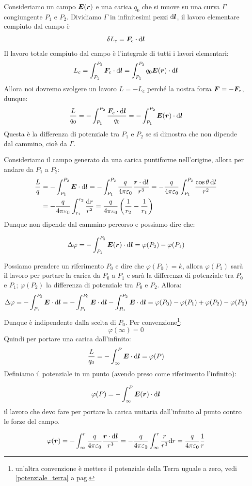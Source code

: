 Consideriamo un campo $\boldsymbol{E}(\boldsymbol{r})$ e una carica $q_0$ che si muove su una curva $\Gamma$ congiungente $P_1$ e $P_2$. Dividiamo $\Gamma$ in infinitesimi pezzi $\mathrm{d}\boldsymbol{l}$, il lavoro elementare compiuto dal campo è
\[\delta L_c=\boldsymbol{F}_c\cdot\mathrm{d}\boldsymbol{l}\]
Il lavoro totale compiuto dal campo è l'integrale di tutti i lavori elementari:
\[L_c=\int_{P_1}^{P_2}\boldsymbol{F}_c\cdot\mathrm{d}\boldsymbol{l}=\int_{P_1}^{P_2}q_0\boldsymbol{E}(\boldsymbol{r})\cdot \mathrm{d} \boldsymbol{l}\]
Allora noi dovremo svolgere un lavoro $L=-L_c$ perché la nostra forza $\boldsymbol{F}=-\boldsymbol{F}_c$, dunque:
\[\frac{L}{q_0}=-\int_{P_1}^{P_2}\frac{\boldsymbol{F}_c\cdot\mathrm{d}\boldsymbol{l}}{q_0}=-\int_{P_1}^{P_2}\boldsymbol{E}(\boldsymbol{r})\cdot\mathrm{d}\boldsymbol{l}\]
Questa è la differenza di potenziale tra $P_1$ e $P_2$ se si dimostra che non dipende dal cammino, cioè da $\Gamma$.

Consideriamo il campo generato da una carica puntiforme nell'origine, allora per andare da $P_1$ a $P_2$:
\begin{align*}
  \frac{L}{q} & =-\int_{P_1}^{P_2}\boldsymbol{E}\cdot\mathrm{d}\boldsymbol{l}=-\int_{P_1}^{P_2}\frac{q}{4\pi\varepsilon_0}\frac{\boldsymbol{r}\cdot\mathrm{d}\boldsymbol{l}}{r^3}=-\frac{q}{4\pi\varepsilon_0}\int_{P_1}^{P_2}\frac{\cos\theta\,\mathrm{d} l}{r^2} \\
              & =-\frac{q}{4\pi\varepsilon_0}\int_{r_1}^{r_2}\frac{\mathrm{d} r}{r^2}=\frac{q}{4\pi\varepsilon_0}\left(\frac{1}{r_2}-\frac{1}{r_1}\right)
\end{align*}
Dunque non dipende dal cammino percorso e possiamo dire che:
\begin{Teo}
  \begin{equation}
    \Delta \varphi=-\int_{P_1}^{P_2}\boldsymbol{E}(\boldsymbol{r})\cdot\mathrm{d}\boldsymbol{l}=\varphi(P_2)-\varphi(P_1)
  \end{equation}
\end{Teo}
Possiamo prendere un riferimento $P_0$ e dire che $\varphi(P_0)=k$, allora $\varphi(P_1)$ sarà il lavoro per portare la carica da $P_0$ a $P_1$ e sarà la differenza di potenziale tra $P_0$ e $P_1$; $\varphi(P_2)$ la differenza di potenziale tra $P_0$ e $P_2$. Allora:
\[\Delta \varphi=-\int_{P_1}^{P_2}\boldsymbol{E}\cdot\mathrm{d}\boldsymbol{l}=-\int_{P_1}^{P_0}\boldsymbol{E}\cdot\mathrm{d}\boldsymbol{l}-\int_{P_0}^{P_2}\boldsymbol{E}\cdot\mathrm{d}\boldsymbol{l}=\varphi(P_0)-\varphi(P_1)+\varphi(P_2)-\varphi(P_0)\]
Dunque è indipendente dalla scelta di $P_0$. Per convenzione\footnote{un'altra convenzione è mettere il potenziale della Terra uguale a zero, vedi \eqref{potenziale_terra} a pag.\@\pageref{potenziale_terra}}:
\[\varphi(\infty)=0\]
Quindi per portare una carica dall'infinito:
\[\frac{L}{q_0}=-\int_{\infty}^{P}\boldsymbol{E}\cdot\mathrm{d} \boldsymbol{l}=\varphi(P)\]
Definiamo il potenziale in un punto (avendo preso come riferimento l'infinito):
\begin{Def}[potenziale]
  \begin{equation}
    \varphi(P)=-\int_{\infty}^P\boldsymbol{E}(\boldsymbol{r})\cdot\mathrm{d}\boldsymbol{l}
  \end{equation}
  il lavoro che devo fare per portare la carica unitaria dall'infinito al punto contro le forze del campo.
\end{Def}
\begin{Es}
  \[
    \varphi(\boldsymbol{r})=-\int_{\infty}^r\frac{q}{4\pi\varepsilon_0}\frac{\boldsymbol{r}\cdot\mathrm{d}\boldsymbol{l}}{r^3}=-\frac{q}{4\pi\varepsilon_0}\int_\infty^r\frac{r}{r^3}\mathrm{d} r=\frac{q}{4\pi\varepsilon_0}\frac{1}{r}
  \]
\end{Es}
